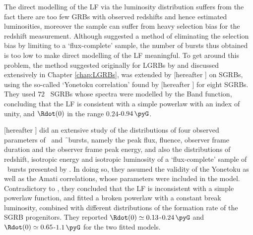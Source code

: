 The direct modelling of the LF via the luminosity distribution suffers from the fact there are too few GRBs with observed redshifts and hence estimated luminosities, moreover the sample can suffer from heavy selection bias for the redshift measurement. Although  suggested a method of eliminating the selection bias by limiting to a `flux-complete' sample, the number of bursts thus obtained is too low to make direct modelling of the LF meaningful. To get around this problem, the method suggested originally for LGRBs by  and discussed extensively in Chapter \ref{chap:LGRBs}, was extended by \cite{Yonetoku_et_al.-2014-ApJ}  [hereafter ] on SGRBs, using the so-called `Yonetoku correlation' found by \cite{Tsutsui_et_al.-2013-MNRAS} [hereafter ] for eight SGRBs. They used $72$ \B\ SGRBs whose spectra were modelled by the Band function, concluding that the LF is consistent with a simple powerlaw with an index of unity, and $\Rdot(0)$ in the range $0.24$-$0.94 \, \pyG$.

\cite{Ghirlanda_et_al.-2016-A&A} [hereafter ] did an extensive study of the distributions of four observed parameters of \s\ and \f\ bursts, namely the peak flux, fluence, observer frame duration and the observer frame peak energy, and also the distributions of redshift, isotropic energy and isotropic luminosity of a `flux-complete' sample of \s\ bursts presented by . In doing so, they assumed the validity of the Yonetoku as well as the Amati correlations, whose parameters were included in the model. Contradictory to , they concluded that the LF is inconsistent with a simple powerlaw function, and fitted a broken powerlaw with a constant break luminosity, combined with different distributions of the formation rate of the SGRB progenitors. They reported $\Rdot(0) \simeq 0.13$-$0.24 \, \pyG$ and $\Rdot(0) \simeq 0.65$-$1.1 \, \pyG$ for the two fitted models.

